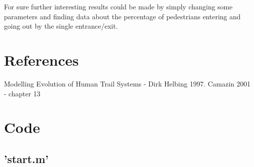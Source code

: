 \documentclass[11pt]{article}
\begin{document}
For sure further interesting results could be made by simply changing some parameters and finding data about the percentage of pedestrians entering and going out by the single entrance/exit.




\newpage
\section{References}

\begin{thebibliography}{9}
 Modelling Evolution of Human Trail Systems - Dirk Helbing 1997.
 Camazin 2001 - chapter 13
\end{thebibliography}


\newpage
\appendix
\section{Code}

\subsection{'start.m'}
\end{document}
